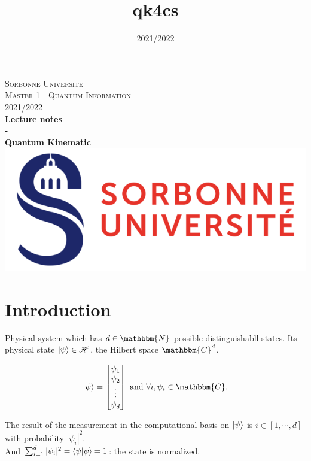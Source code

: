 \documentclass{article}
\title{qk4cs}
\author{}
\date{2021/2022}
\begin{document}
\begin{titlepage}
\begin{center}

\textsc{\LARGE Sorbonne Universite} \\[1cm]
\textsc{\LARGE Master 1 - Quantum Information} \\[1cm]
\textsc{\Large 2021/2022} \\[7cm]


{\huge \bfseries Lecture notes} \\[0.5cm]
{\huge \bfseries -} \\[0.5cm]
{\huge \bfseries Quantum Kinematic} \\[4cm]
\vfill
\includegraphics[scale=0.6]{su.png}
\end{center}
\end{titlepage}

\tableofcontents

\newpage

\section{Introduction}
Physical system which has $d \in \mathbbm{N}$ possible distinguishabll states.
Its physical state $\ket{\psi} \in \mathscr{H}$, the Hilbert space $\mathbbm{C}^d$.

\begin{equation}
    \ket{\psi} = \begin{bmatrix} \psi_1\\ \psi_2 \\ \vdots \\ \psi_d\end{bmatrix}
    \text{ and } \forall i, \psi_i \in \mathbbm{C}.
\end{equation}


\noindent
The result of the measurement in the computational basis on
$\ket{\psi}$
 is $i \in [1, \cdots, d]$ with probability $|\psi_i|^2$.
 \\ \noindent
And $\sum_{i=1}^d |\psi_i|^2 = \braket{\psi|\psi} = 1$: the state is normalized.
\end{document}
